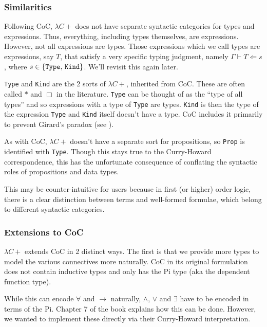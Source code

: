 \documentclass{article}
\begin{document}
\subsubsection{Similarities}
Following CoC, $\lambda C+$ does not have separate syntactic categories for types
and expressions. Thus, everything, including types themselves, are expressions.
However, not all expressions are types.
Those expressions which we call types are expressions, say $T$, that satisfy
a very specific typing judgment, namely $\Gamma \vdash T \Leftarrow s$,
where $s \in \{ \texttt{Type}, \, \texttt{Kind} \}$. We'll revisit this again later.

\texttt{Type} and \texttt{Kind} are the 2 sorts of $\lambda C+$, inherited from
CoC. These are often called $*$ and $\Box$ in the literature.
\texttt{Type} can be thought of as the ``type of all types'' and so expressions
with a type of \texttt{Type} are types.
\texttt{Kind} is then the type of the expression \texttt{Type} and
\texttt{Kind} itself doesn't have a type.
CoC includes it primarily to prevent Girard's paradox
(see \cite{analysis_of_girard}).

As with CoC, $\lambda C+$ doesn't have a separate sort for propositions, so 
\texttt{Prop} is identified with \texttt{Type}.
Though this stays true to the Curry-Howard correspondence, this has the
unfortunate consequence of conflating the syntactic roles of propositions and
data types.
  
This may be counter-intuitive for users because in first (or higher) order
logic, there is a clear distinction between terms and well-formed formulae,
which belong to different syntactic categories. 

\subsubsection{Extensions to CoC}
$\lambda C+$ extends CoC in 2 distinct ways. The first is that we provide more
types to model the various connectives more naturally.
CoC in its original formulation does not contain inductive types and only has
the Pi type (aka the dependent function type).

While this can encode $\forall$ and $\rightarrow$ naturally, $\wedge$, $\vee$ and
$\exists$ have to be encoded in terms of the Pi.
Chapter 7 of the book \cite{type_theory_and_formal_proof} explains how this can
be done.
However, we wanted to implement these directly via their Curry-Howard
interpretation.
\end{document}
